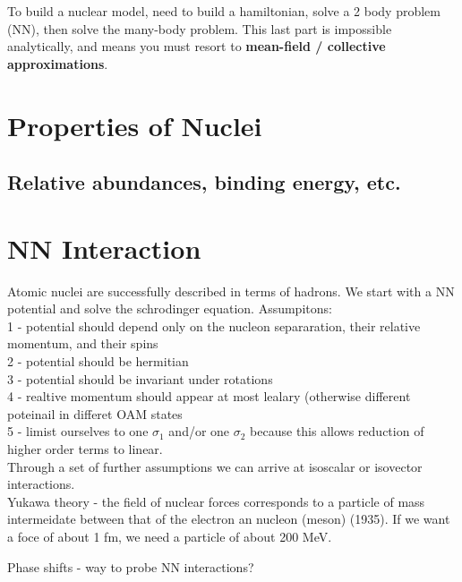     To build a nuclear model, need to build a hamiltonian, solve a 2 body problem (NN), then solve the many-body problem. This last part is impossible analytically, and means you must resort to \textbf{mean-field / collective approximations}.\\
    
    

    \section{Properties of Nuclei}
        \subsection{Relative abundances, binding energy, etc. }
    \section{NN Interaction}
        \indent Atomic nuclei are successfully described in terms of hadrons. We start with a NN potential and solve the schrodinger equation. Assumpitons:\\
        1 - potential should depend only on the nucleon separaration, their relative momentum, and their spins\\
        2 - potential should be hermitian\\
        3 - potential should be invariant under rotations\\
        4 - realtive momentum should appear at most lealary (otherwise different poteinail in differet OAM states\\
        5 - limist ourselves to one $\sigma_1$ and/or one $\sigma_2$ because this allows reduction of higher order terms to linear.\\
        \newline
        Through a set of further assumptions we can arrive at isoscalar or isovector interactions. \\
        \newline
        Yukawa theory - the field of nuclear forces corresponds to a particle of mass intermeidate between that of the electron an nucleon (meson) (1935). If we want a foce of about 1 fm, we need a particle of about 200 MeV. 
        
        Phase shifts - way to probe NN interactions?